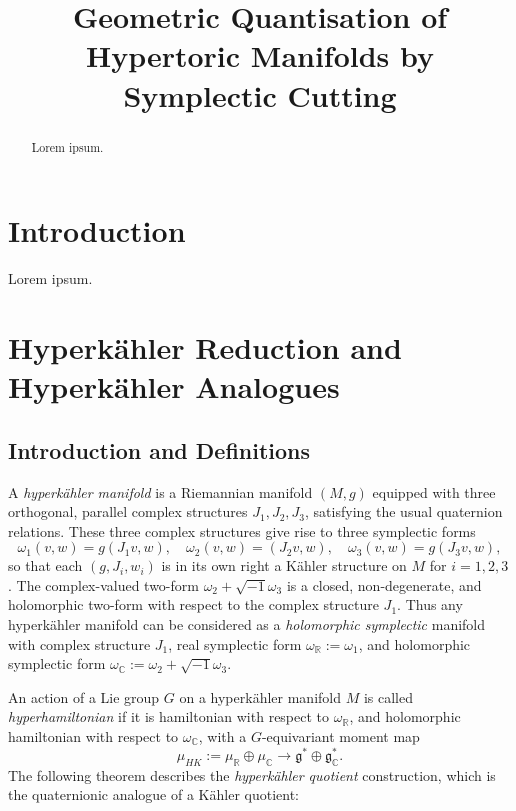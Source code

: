 \documentclass{article}
\title{Geometric Quantisation of Hypertoric Manifolds by Symplectic Cutting}
\date{}	%
\newcommand{\w}{\omega}
\newcommand{\K}{K\"ahler }
\newcommand{\HK}{hyperk\"ahler }
\newcommand{\RR}{\mathbb{R}}
\newcommand{\CC}{\mathbb{C}}
\newcommand{\mf}[1]{\mathfrak{#1}}
\begin{document}
	\maketitle
	
	\begin{abstract}
		Lorem ipsum.
	\end{abstract}
	
	\section{Introduction}
	
	Lorem ipsum.
	
	\section{Hyperk{\"a}hler Reduction and Hyperk{\"a}hler Analogues}
	
	\subsection{Introduction and Definitions}
	
	A \emph{\HK manifold} is a Riemannian manifold $(M,g)$ equipped with three orthogonal, parallel complex structures $J_{1}, J_{2}, J_{3}$, satisfying the usual quaternion relations. These three complex structures give rise to three symplectic forms
	$$
	\w_{1}(v,w) = g(J_{1}v,w),\quad \w_{2}(v,w) = (J_{2}v,w),\quad \w_{3}(v,w) = g(J_{3}v,w),
	$$
	so that each $(g,J_{i},w_{i})$ is in its own right a \K structure on $M$ for $i = 1,2,3$. The complex-valued two-form $\w_{2} + \sqrt{-1}\w_{3}$ is a closed, non-degenerate, and holomorphic two-form with respect to the complex structure $J_{1}$. Thus any \HK manifold can be considered as a \emph{holomorphic symplectic} manifold with complex structure $J_{1}$, real symplectic form $\w_{\RR} := \w_{1}$, and holomorphic symplectic form $\w_{\CC} := \w_{2} + \sqrt{-1}\w_{3}$.
	
	An action of a Lie group $G$ on a \HK manifold $M$ is called \emph{hyperhamiltonian} if it is hamiltonian with respect to $\w_{\RR}$, and holomorphic hamiltonian with respect to $\w_{\CC}$, with a $G$-equivariant moment map
	$$
	\mu_{HK} := \mu_{\RR} \oplus \mu_{\CC} \longrightarrow \mf{g}^{\ast} \oplus \mf{g}_{\CC}^{\ast}.
	$$
	The following theorem describes the \emph{\HK quotient} construction, which is the quaternionic analogue of a \K quotient:
	
\end{document}
